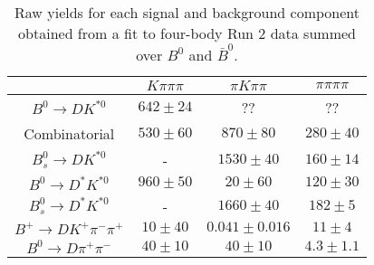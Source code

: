 \begin{table}
  \centering
  \begin{tabular}{cccc}
      \toprule
       & $K\pi\pi\pi$ & $\pi K\pi\pi$ & $\pi\pi\pi\pi$ \\
      \midrule
      $B^0 \to DK^{*0}$ & $642 \pm 24$ & ?? & ?? \\
      Combinatorial & $530 \pm 60$ & $870 \pm 80$ & $280 \pm 40$ \\
      $B^0_s \to DK^{*0}$ & \-- & $1530 \pm 40$ & $160 \pm 14$ \\
      $B^0 \to D^*K^{*0}$ & $960 \pm 50$ & $20 \pm 60$ & $120 \pm 30$ \\
      $B^0_s \to D^*K^{*0}$ & \-- & $1660 \pm 40$ & $182 \pm 5$ \\
      $B^+ \to DK^+\pi^-\pi^+$ & $10 \pm 40$ & $0.041 \pm 0.016$ & $11 \pm 4$ \\
      $B^0 \to D\pi^+\pi^-$ & $40 \pm 10$ & $40 \pm 10$ & $4.3 \pm 1.1$ \\
      \bottomrule
      \end{tabular}
  \caption{Raw yields for each signal and background component obtained from a fit to four-body Run 2 data summed over $B^0$ and $\bar{B}^0$.}
\label{tab:yields_combined_4body_run2}
\end{table}
